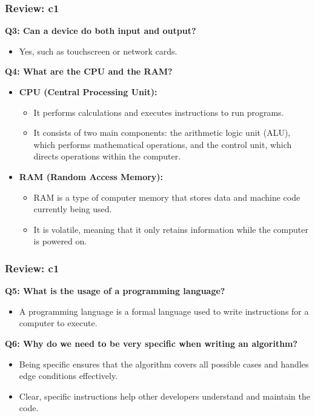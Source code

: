 \documentclass[
	11pt, %
]{beamer}
\begin{document}
\begin{frame}
	\frametitle{Review: c1}

	\textbf{Q3: Can a device do both input and output?}

	\begin{itemize}
	    \item Yes, such as touchscreen or network cards.
	\end{itemize}

	\vspace{0.5cm}

	\textbf{Q4: What are the CPU and the RAM?}

	\begin{itemize}
	    \item \textbf{CPU (Central Processing Unit):}
	    \begin{itemize}
	        \item It performs calculations and executes instructions to run programs.
	        \item It consists of two main components: the arithmetic logic unit (ALU), which performs mathematical operations, and the control unit, which directs operations within the computer.
	    \end{itemize}
	    
	    \item \textbf{RAM (Random Access Memory):}
	    \begin{itemize}
	        \item RAM is a type of computer memory that stores data and machine code currently being used.
	        \item It is volatile, meaning that it only retains information while the computer is powered on.
	    \end{itemize}
	\end{itemize}

\end{frame}



\begin{frame}
	\frametitle{Review: c1}

	\textbf{Q5: What is the usage of a programming language?}

	\begin{itemize}
	    \item A programming language is a formal language used to write instructions for a computer to execute.
	\end{itemize}

	\vspace{0.5cm}

	\textbf{Q6: Why do we need to be very specific when writing an algorithm?}

	\begin{itemize}
	    \item Being specific ensures that the algorithm covers all possible cases and handles edge conditions effectively.
	    \item Clear, specific instructions help other developers understand and maintain the code.
	\end{itemize}

\end{frame}
\end{document}
